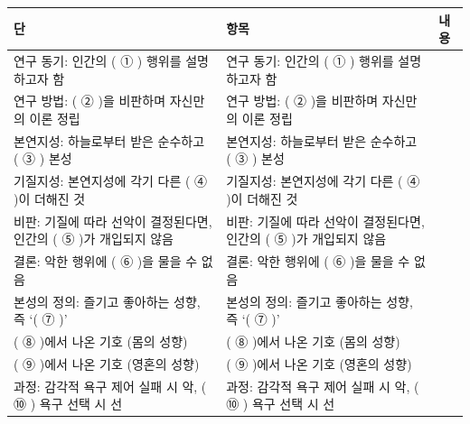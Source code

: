 \documentclass[fs9,seriesRus]{korfarm-base}
\begin{document}
\kfActivityBg \par{}\par\nopagebreak[4]\smallskip\nopagebreak[4]
\par\medskip{}
\begin{tcolorbox}[enhanced, breakable=true,
  colback=kfPaper, colframe=kfRule, boxrule=0.4pt, arc=2pt,
  left=8pt, right=8pt, top=6pt, bottom=6pt,
  title={\footnotesize\bfseries\color{kfMute} 글의 구조도},
  coltitle=kfMute, colbacktitle=kfPrimaryLight!40,
  attach boxed title to top left={yshift=-1.5mm, xshift=6pt},
  boxed title style={colframe=kfRule, boxrule=0.3pt, arc=1pt}]
\footnotesize{}
\renewcommand{\arraystretch}{1.35}
\noindent\begin{tabularx}{\linewidth}{|>{\centering\arraybackslash}p{1.6cm}|>{\raggedright\arraybackslash}p{3.4cm}|>{\raggedright\arraybackslash}X|}
\hline
\rowcolor{kfPrimaryLight!40}\textbf{\color{kfPrimary}단} & \textbf{\color{kfPrimary}항목} & \textbf{\color{kfPrimary}내용} \\\hline
연구 동기: 인간의 ( ① ) 행위를 설명하고자 함 & 연구 동기: 인간의 ( ① ) 행위를 설명하고자 함 &  \\\hline
연구 방법: ( ② )을 비판하며 자신만의 이론 정립 & 연구 방법: ( ② )을 비판하며 자신만의 이론 정립 &  \\\hline
본연지성: 하늘로부터 받은 순수하고 ( ③ ) 본성 & 본연지성: 하늘로부터 받은 순수하고 ( ③ ) 본성 &  \\\hline
기질지성: 본연지성에 각기 다른 ( ④ )이 더해진 것 & 기질지성: 본연지성에 각기 다른 ( ④ )이 더해진 것 &  \\\hline
비판: 기질에 따라 선악이 결정된다면, 인간의 ( ⑤ )가 개입되지 않음 & 비판: 기질에 따라 선악이 결정된다면, 인간의 ( ⑤ )가 개입되지 않음 &  \\\hline
결론: 악한 행위에 ( ⑥ )을 물을 수 없음 & 결론: 악한 행위에 ( ⑥ )을 물을 수 없음 &  \\\hline
본성의 정의: 즐기고 좋아하는 성향, 즉 ‘( ⑦ )’ & 본성의 정의: 즐기고 좋아하는 성향, 즉 ‘( ⑦ )’ &  \\\hline
( ⑧ )에서 나온 기호 (몸의 성향) & ( ⑧ )에서 나온 기호 (몸의 성향) &  \\\hline
( ⑨ )에서 나온 기호 (영혼의 성향) & ( ⑨ )에서 나온 기호 (영혼의 성향) &  \\\hline
과정: 감각적 욕구 제어 실패 시 악, ( ⑩ ) 욕구 선택 시 선 & 과정: 감각적 욕구 제어 실패 시 악, ( ⑩ ) 욕구 선택 시 선 &  \\\hline

\end{tabularx}
\end{tcolorbox}
\end{document}
